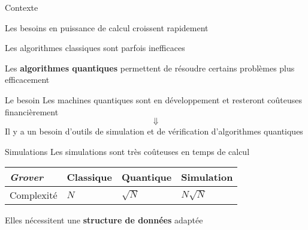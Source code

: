 \begin{frame}{Contexte}

\begin{center}
  Les besoins en puissance de calcul croissent rapidement
  

  Les algorithmes classiques sont parfois inefficaces

  \pause
  Les \textbf{algorithmes quantiques} permettent de résoudre certains problèmes plus efficacement
  \end{center}
\end{frame}

\begin{frame}{Le besoin}
  Les machines quantiques sont en développement et resteront coûteuses financièrement
  $$\Downarrow$$
  Il y a un besoin d'outils de simulation et de vérification d'algorithmes quantiques
\end{frame}

\begin{frame}{Simulations}
  Les simulations sont très coûteuses en temps de calcul
  \begin{table}[]
    \begin{tabular}{l|l|l|l}
        \textit{Grover} & Classique & Quantique & Simulation    \\ \hline \rule{0pt}{2.6ex}
    Complexité & $N$       & $\sqrt N$ & {\color{red}$N \sqrt N$}
    \end{tabular}
  \end{table}

  \vspace{1em}

  Elles nécessitent une \textbf{structure de données} adaptée
\end{frame}